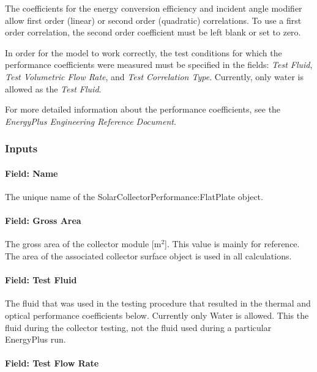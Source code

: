 The coefficients for the energy conversion efficiency and incident angle modifier allow first order (linear) or second order (quadratic) correlations. To use a first order correlation, the second order coefficient must be left blank or set to zero.

In order for the model to work correctly, the test conditions for which the performance coefficients were measured must be specified in the fields: \emph{Test Fluid}, \emph{Test Volumetric Flow Rate}, and \emph{Test Correlation Type}. Currently, only water is allowed as the \emph{Test Fluid}.

For more detailed information about the performance coefficients, see the \emph{EnergyPlus Engineering Reference Document}.

\subsubsection{Inputs}\label{inputs-1-042}

\paragraph{Field: Name}\label{field-name-1-041}

The unique name of the SolarCollectorPerformance:FlatPlate object.

\paragraph{Field: Gross Area}\label{field-gross-area}

The gross area of the collector module {[}m\(^{2}\){]}. This value is mainly for reference. The area of the associated collector surface object is used in all calculations.

\paragraph{Field: Test Fluid}\label{field-test-fluid}

The fluid that was used in the testing procedure that resulted in the thermal and optical performance coefficients below. Currently only Water is allowed. This the fluid during the collector testing, not the fluid used during a particular EnergyPlus run.

\paragraph{Field: Test Flow Rate}\label{field-test-flow-rate}


